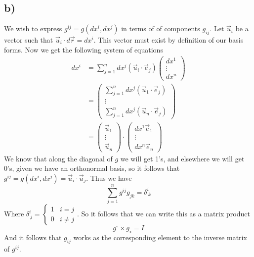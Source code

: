 \documentclass{article}
\theoremstyle{definition}
\begin{document}
\subsection*{b)}
We wish to express $g^{ij} = g(dx^i,dx^j)$ in terms of of components $g_{ij}$.
Let $\vec u_i$ be a vector such that $\vec u_i \cdot d\vec{r} = dx^i$.
This vector must exist by definition of our basis forms.
Now we get the following system of equations
\begin{align*}
  dx^i & = \sum_{j = 1}^n dx^j(\vec u_i \cdot \vec e_j)
  \begin{pmatrix}
    dx^1\\
    \vdots\\
    dx^n
  \end{pmatrix}\\
   & = \begin{pmatrix}
    \sum_{j = 1}^n dx^j(\vec u_1 \cdot \vec e_j)\\
    \vdots\\
    \sum_{j = 1}^n dx^j(\vec u_n \cdot \vec e_j)
  \end{pmatrix}\\
  &= \begin{pmatrix}
    \vec u_1 \\
    \vdots \\
    \vec u_n
  \end{pmatrix}
  \cdot \begin{pmatrix}
    dx^1 \vec e_1 \\
    \vdots \\
    dx^n \vec e_n
  \end{pmatrix}
\end{align*}
We know that along the diagonal of $g$ we will get 1's, and elsewhere we will get 0's,
given we have an orthonormal basis, so it follows that $g^{ij} = g(dx^i, dx^j) = \vec u_i \cdot \vec u_j$.
Thus we have 
\[
  \sum_{j = 1}^n g^{ij}g_{jk} = \delta^i_{\ k}
\]
Where $\delta^i_{\ j} = \begin{cases}
  1 & i = j \\
  0 & i \neq j
\end{cases}$. So it follows that we can write this as a matrix product 
\[
  g^\circ \times g_\circ = I
\]
And it follows that $g_{ij}$ works as the corresponding element to the inverse matrix of $g^{ij}$.
\end{document}
